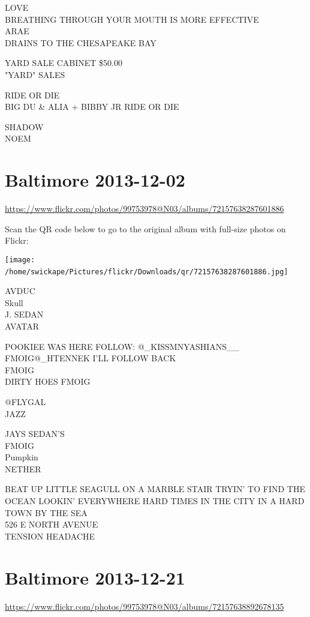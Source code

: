 \documentclass[10pt,letterpaper]{article}
\begin{document}
LOVE\\
BREATHING THROUGH YOUR MOUTH IS MORE EFFECTIVE\\
ARAE\\
DRAINS TO THE CHESAPEAKE BAY

YARD SALE CABINET \$50.00\\
"YARD" SALES

RIDE OR DIE\\
BIG DU \& ALIA + BIBBY JR RIDE OR DIE

SHADOW\\
NOEM
\

\section*{Baltimore 2013-12-02}

\url{https://www.flickr.com/photos/99753978@N03/albums/72157638287601886}

Scan the QR code below to go to the original album with full-size photos on Flickr:

\texttt{[image: /home/swickape/Pictures/flickr/Downloads/qr/72157638287601886.jpg]}
\

AVDUC\\
Skull\\
J. SEDAN\\
AVATAR

POOKIEE WAS HERE FOLLOW: @\_KISSMNYASHIANS\_\_\\
FMOIG@\_HTENNEK I'LL FOLLOW BACK\\
FMOIG\\
DIRTY HOES FMOIG

@FLYGAL\\
JAZZ

JAYS SEDAN'S\\
FMOIG\\
Pumpkin\\
NETHER

BEAT UP LITTLE SEAGULL ON A MARBLE STAIR TRYIN' TO FIND THE OCEAN LOOKIN' EVERYWHERE HARD TIMES IN THE CITY IN A HARD TOWN BY THE SEA\\
526 E NORTH AVENUE\\
TENSION HEADACHE
\

\section*{Baltimore 2013-12-21}

\url{https://www.flickr.com/photos/99753978@N03/albums/72157638892678135}
\end{document}

